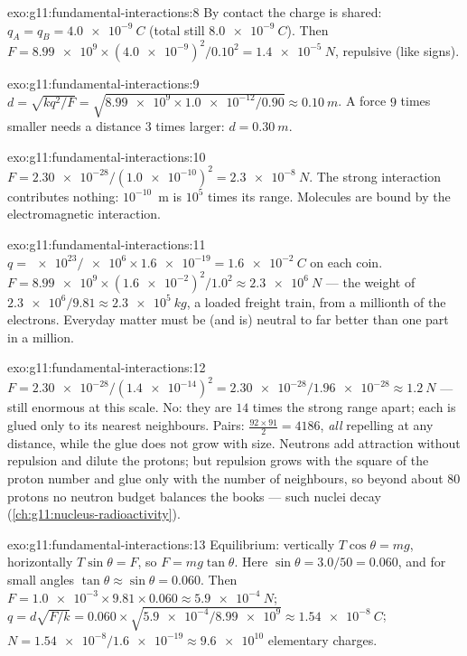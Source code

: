 \begin{solution}{exo:g11:fundamental-interactions:8}
By contact the charge is shared: $q_A = q_B = \qty{+4.0e-9}{C}$ (total
still $\qty{8.0e-9}{C}$). Then
$F = \num{8.99e9} \times (\num{4.0e-9})^2/0.10^2 =
\qty{1.4e-5}{N}$, repulsive (like signs).
\end{solution}

\begin{solution}{exo:g11:fundamental-interactions:9}
$d = \sqrt{k q^2/F} = \sqrt{\num{8.99e9} \times \num{1.0e-12}/0.90}
\approx \qty{0.10}{m}$. A force $9$ times smaller needs a distance $3$
times larger: $d = \qty{0.30}{m}$.
\end{solution}

\begin{solution}{exo:g11:fundamental-interactions:10}
$F = \num{2.30e-28}/(\num{1.0e-10})^2 = \qty{2.3e-8}{N}$. The strong
interaction contributes nothing: $10^{-10}$~m is $10^{5}$ times its
range. Molecules are bound by the electromagnetic interaction.
\end{solution}

\begin{solution}{exo:g11:fundamental-interactions:11}
$q = \num{e23}/\num{e6} \times \num{1.6e-19} = \qty{1.6e-2}{C}$ on each
coin. $F = \num{8.99e9} \times (\num{1.6e-2})^2/1.0^2 \approx
\qty{2.3e6}{N}$ --- the weight of $\num{2.3e6}/9.81 \approx
\qty{2.3e5}{kg}$, a loaded freight train, from a millionth of the
electrons. Everyday matter must be (and is) neutral to far better than
one part in a million.
\end{solution}

\begin{solution}{exo:g11:fundamental-interactions:12}
$F = \num{2.30e-28}/(\num{1.4e-14})^2 = \num{2.30e-28}/\num{1.96e-28}
\approx \qty{1.2}{N}$ --- still enormous at this scale. No: they are
$14$ times the strong range apart; each is glued only to its nearest
neighbours. Pairs: $\frac{92 \times 91}{2} = 4186$, \emph{all}
repelling at any distance, while the glue does not grow with size.
Neutrons add attraction without repulsion and dilute the protons; but
repulsion grows with the square of the proton number and glue only with
the number of neighbours, so beyond about $80$ protons no neutron
budget balances the books --- such nuclei decay
(\cref{ch:g11:nucleus-radioactivity}).
\end{solution}

\begin{solution}{exo:g11:fundamental-interactions:13}
Equilibrium: vertically $T\cos\theta = mg$, horizontally
$T\sin\theta = F$, so $F = mg\tan\theta$. Here
$\sin\theta = 3.0/50 = 0.060$, and for small angles
$\tan\theta \approx \sin\theta = 0.060$. Then
$F = \num{1.0e-3} \times 9.81 \times 0.060 \approx \qty{5.9e-4}{N}$;
$q = d\sqrt{F/k} = 0.060 \times \sqrt{\num{5.9e-4}/\num{8.99e9}}
\approx \qty{1.54e-8}{C}$; $N = \num{1.54e-8}/\num{1.6e-19} \approx
\num{9.6e10}$ elementary charges.
\end{solution}

